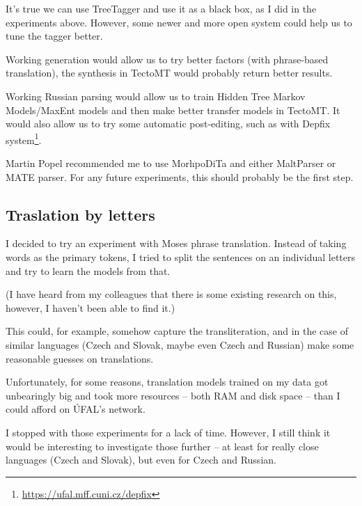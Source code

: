 It's true we can use TreeTagger and use it as a black box, as I did in the experiments above. 
However, some newer and more open system could help us to tune the tagger better. 

Working generation would allow us to try better factors (with phrase-based translation), the synthesis in TectoMT would probably return better results.

Working Russian parsing would allow us to train Hidden Tree Markov Models/MaxEnt models and then make better transfer models in TectoMT. It would also allow us to try some automatic post-editing, such as with Depfix system\footnote{\url{https://ufal.mff.cuni.cz/depfix}}.

Martin Popel recommended me to use MorhpoDiTa and either MaltParser or MATE parser. For any future experiments, this should probably be the first step.

\subsection{Traslation by letters}
I decided to try an experiment with Moses phrase translation. Instead of taking words as the primary tokens, I tried to split the sentences on an individual letters and try to learn the models from that.

(I have heard from my colleagues that there is some existing research on this, however, I haven't been able to find it.)

This could, for example, somehow capture the transliteration, and in the case of similar languages (Czech and Slovak, maybe even Czech and Russian) make some reasonable guesses on translations.

Unfortunately, for some reasons, translation models trained on my data got unbearingly big and took more resources -- both RAM and disk space -- than I could afford on ÚFAL's network. 

I stopped with those experiments for a lack of time. However, I still think it would be interesting to investigate those further -- at least for really close languages (Czech and Slovak), but even for Czech and Russian.
